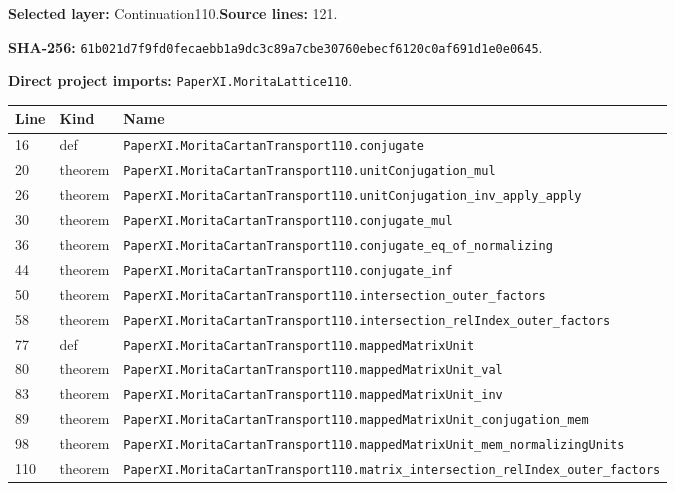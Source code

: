 \documentclass[10pt,oneside]{book}
\begin{document}
\textbf{Selected layer:} Continuation110.\quad\textbf{Source lines:} 121.\par\textbf{SHA-256:} {\scriptsize\nolinkurl{61b021d7f9fd0fecaebb1a9dc3c89a7cbe30760ebecf6120c0af691d1e0e0645}}.


\textbf{Direct project imports:} \nolinkurl{PaperXI.MoritaLattice110}.

\begin{longtable}{@{}p{}p{}p{}@{}}\toprule Line&Kind&Name\\\midrule\endhead

16&def&\nolinkurl{PaperXI.MoritaCartanTransport110.conjugate}\\

20&theorem&\nolinkurl{PaperXI.MoritaCartanTransport110.unitConjugation_mul}\\

26&theorem&\nolinkurl{PaperXI.MoritaCartanTransport110.unitConjugation_inv_apply_apply}\\

30&theorem&\nolinkurl{PaperXI.MoritaCartanTransport110.conjugate_mul}\\

36&theorem&\nolinkurl{PaperXI.MoritaCartanTransport110.conjugate_eq_of_normalizing}\\

44&theorem&\nolinkurl{PaperXI.MoritaCartanTransport110.conjugate_inf}\\

50&theorem&\nolinkurl{PaperXI.MoritaCartanTransport110.intersection_outer_factors}\\

58&theorem&\nolinkurl{PaperXI.MoritaCartanTransport110.intersection_relIndex_outer_factors}\\

77&def&\nolinkurl{PaperXI.MoritaCartanTransport110.mappedMatrixUnit}\\

80&theorem&\nolinkurl{PaperXI.MoritaCartanTransport110.mappedMatrixUnit_val}\\

83&theorem&\nolinkurl{PaperXI.MoritaCartanTransport110.mappedMatrixUnit_inv}\\

89&theorem&\nolinkurl{PaperXI.MoritaCartanTransport110.mappedMatrixUnit_conjugation_mem}\\

98&theorem&\nolinkurl{PaperXI.MoritaCartanTransport110.mappedMatrixUnit_mem_normalizingUnits}\\

110&theorem&\nolinkurl{PaperXI.MoritaCartanTransport110.matrix_intersection_relIndex_outer_factors}\\

\bottomrule\end{longtable}
\end{document}
